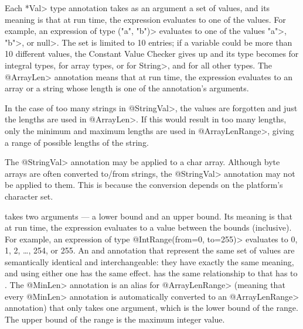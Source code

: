 Each \<*Val> type annotation takes as an argument a set of values, and its
meaning is that at run time, the expression evaluates to one of the values.  For
example, an expression of type
\<("a", "b")> evaluates to
one of the values \<"a">, \<"b">, or \<null>.
The set is limited to 10 entries; if a variable
could be more than 10 different values, the Constant Value
Checker gives up and its type becomes
 for integral types,
 for array types,
 or  for \<String>, and
 for all other types.
The \<@ArrayLen> annotation means that at run time, the expression
evaluates to an array or a string whose length is one of the annotation's arguments.

In the case of too many strings in \<@StringVal>, the values are forgotten
and just the lengths are used in \<@ArrayLen>.
If this would result in too many lengths,
only the minimum and maximum lengths are used in \<@ArrayLenRange>,
giving a range of possible lengths of the string.

The \<@StringVal> annotation may be applied to a char array.  Although byte
arrays are often converted to/from strings, the \<@StringVal> annotation may
not be applied to them.  This is because the conversion depends on the
platform's character set.


 takes two arguments --- a lower
bound and an upper bound.  Its meaning is that at run time, the expression
evaluates to a value between the bounds (inclusive).  For example, an
expression of type \<@IntRange(from=0, to=255)> evaluates to
0, 1, 2, \ldots, 254, or 255.
An  and
 annotation that represent the
same set of values are semantically identical and interchangeable:  they
have exactly the same meaning, and using either one has the same effect.
 has the same relationship
to  that
 has to
.
The \<@MinLen> annotation is an alias for \<@ArrayLenRange> (meaning that every \<@MinLen> annotation
 is automatically converted to an \<@ArrayLenRange> annotation) that only takes
one argument, which is the lower bound of the range. The upper bound of the
range is the maximum integer value.

